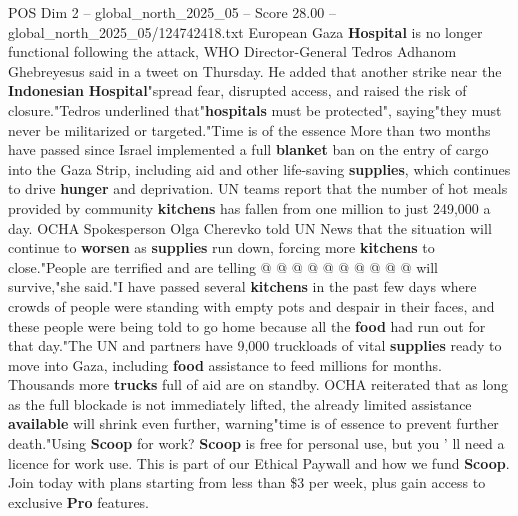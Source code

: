\begin{textsample}{POS Dim 2 – global\_north\_2025\_05 – Score 28.00 – global\_north\_2025\_05/124742418.txt}
European Gaza \textbf{Hospital} is no longer functional following the attack, WHO Director-General Tedros Adhanom Ghebreyesus said in a tweet on Thursday.
He added that another strike near the \textbf{Indonesian} \textbf{Hospital}"spread fear, disrupted access, and raised the risk of closure."Tedros underlined that"\textbf{hospitals} must be protected", saying"they must never be militarized or targeted."Time is of the essence More than two months have passed since Israel implemented a full \textbf{blanket} ban on the entry of cargo into the Gaza Strip, including aid and other life-saving \textbf{supplies}, which continues to drive \textbf{hunger} and deprivation.
UN teams report that the number of hot meals provided by community \textbf{kitchens} has fallen from one million to just 249,000 a day.
OCHA Spokesperson Olga Cherevko told UN News that the situation will continue to \textbf{worsen} as \textbf{supplies} run down, forcing more \textbf{kitchens} to close."People are terrified and are telling @ @ @ @ @ @ @ @ @ @ will survive,"she said."I have passed several \textbf{kitchens} in the past few days where crowds of people were standing with empty pots and despair in their faces, and these people were being told to go home because all the \textbf{food} had run out for that day."The UN and partners have 9,000 truckloads of vital \textbf{supplies} ready to move into Gaza, including \textbf{food} assistance to feed millions for months.
Thousands more \textbf{trucks} full of aid are on standby.
OCHA reiterated that as long as the full blockade is not immediately lifted, the already limited assistance \textbf{available} will shrink even further, warning"time is of essence to prevent further death."Using \textbf{Scoop} for work? \textbf{Scoop} is free for personal use, but you ' ll need a licence for work use.
This is part of our Ethical Paywall and how we fund \textbf{Scoop}.
Join today with plans starting from less than \$3 per week, plus gain access to exclusive \textbf{Pro} features.

\end{textsample}
